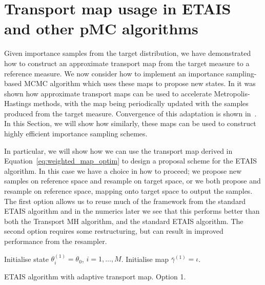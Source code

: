 \documentclass[final]{siamltex}
\begin{document}
\section[Transport map MCMC]{Transport map usage in ETAIS
  and other pMC algorithms}\label{sec:TETAIS}

Given importance samples from the target distribution, we have demonstrated how to construct an approximate transport map from the
target measure to a reference measure. We now consider how to
implement an importance sampling-based MCMC algorithm which uses
these maps to propose new states. In \cite{parno2014transport} it was
shown how approximate transport maps can be used to accelerate
Metropolis-Hastings methods, with the map being periodically updated
with the samples produced from the target measure. Convergence of this
adaptation is shown in~\cite{parno2014transport}. In this Section, we
will show how similarly, these maps can be used to construct highly
efficient importance sampling schemes.

In particular, we will show how we can use the transport map derived in Equation~\eqref{eq:weighted_map_optim} to
design a proposal scheme for the ETAIS algorithm. In this case we have a choice in how to proceed; we
propose new samples on reference space and resample on target space, or we both propose and resample on reference space, mapping onto target space to output the samples. The first option allows us to reuse much of the framework
from the standard ETAIS algorithm and in the numerics later we see that this performs better than
both the Transport MH algorithm, and the standard ETAIS algorithm. The second option requires some
restructuring, but can result in improved performance from the resampler.

\begin{table}
\begin{algorithm}[H]
\DontPrintSemicolon
\BlankLine
Initialise state $\theta^{(1)}_i = \theta_0$, \quad $i = 1,\dots,M$.\;
Initialise map $\bar{\gamma}^{(1)} = \iota$.\;
\caption{ETAIS algorithm with adaptive transport map. Option 1.\label{alg:TransportETAIS1}}
\end{algorithm}
\end{table}
\end{document}
